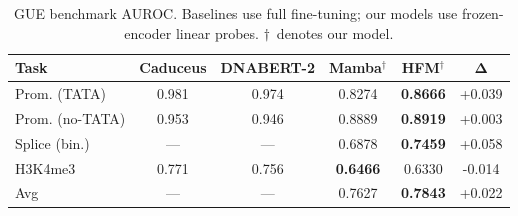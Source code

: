 
\begin{table}[t]
\centering
\caption{GUE benchmark AUROC. Baselines use full fine-tuning; our models use frozen-encoder linear probes. $\dagger$~denotes our model.}
\label{tab:gue}
\footnotesize
\begin{tabular}{lccccc}
\toprule
\textbf{Task} & \textbf{Caduceus} & \textbf{DNABERT-2}
              & \textbf{Mamba}$^\dagger$ & \textbf{HFM}$^\dagger$ & $\bm{\Delta}$ \\
\midrule
Prom. (TATA) & 0.981 & 0.974 & 0.8274 & \textbf{0.8666} & +0.039 \\
Prom. (no-TATA) & 0.953 & 0.946 & 0.8889 & \textbf{0.8919} & +0.003 \\
Splice (bin.) & --- & --- & 0.6878 & \textbf{0.7459} & +0.058 \\
H3K4me3 & 0.771 & 0.756 & \textbf{0.6466} & 0.6330 & -0.014 \\
\midrule
Avg & --- & --- & 0.7627 & \textbf{0.7843} & +0.022 \\
\bottomrule
\end{tabular}
\end{table}
